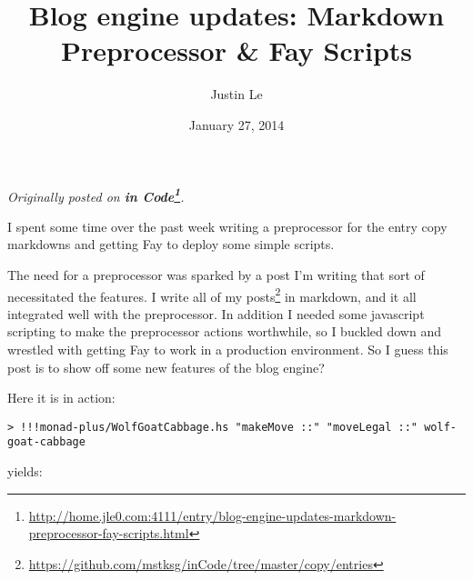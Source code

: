 \documentclass[]{article}
\title{Blog engine updates: Markdown Preprocessor \& Fay Scripts}
\author{Justin Le}
\date{January 27, 2014}
\newenvironment{Shaded}{}{}
\newcommand{\KeywordTok}[1]{\textcolor[rgb]{0.00,0.44,0.13}{\textbf{{#1}}}}
\newcommand{\DataTypeTok}[1]{\textcolor[rgb]{0.56,0.13,0.00}{{#1}}}
\newcommand{\CommentTok}[1]{\textcolor[rgb]{0.38,0.63,0.69}{\textit{{#1}}}}
\newcommand{\OtherTok}[1]{\textcolor[rgb]{0.00,0.44,0.13}{{#1}}}
\newcommand{\FunctionTok}[1]{\textcolor[rgb]{0.02,0.16,0.49}{{#1}}}
\newcommand{\NormalTok}[1]{{#1}}
\renewcommand{\href}[2]{#2\footnote{\url{#1}}}
\begin{document}
\maketitle

\emph{Originally posted on
\textbf{\href{http://home.jle0.com:4111/entry/blog-engine-updates-markdown-preprocessor-fay-scripts.html}{in
Code}}.}

I spent some time over the past week writing a preprocessor for the entry copy
markdowns and getting Fay to deploy some simple scripts.

The need for a preprocessor was sparked by a post I'm writing that sort of
necessitated the features. I write
\href{https://github.com/mstksg/inCode/tree/master/copy/entries}{all of my
posts} in markdown, and it all integrated well with the preprocessor. In
addition I needed some javascript scripting to make the preprocessor actions
worthwhile, so I buckled down and wrestled with getting Fay to work in a
production environment. So I guess this post is to show off some new features of
the blog engine?

Here it is in action:

\begin{verbatim}
> !!!monad-plus/WolfGoatCabbage.hs "makeMove ::" "moveLegal ::" wolf-goat-cabbage
\end{verbatim}

yields:

\begin{Shaded}
\end{Shaded}
\end{document}
